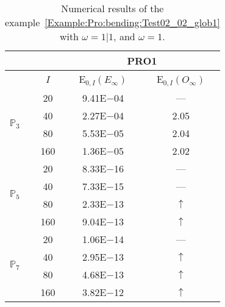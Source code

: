 \begin{table}[H]
\caption{Numerical results of the example~\ref{Example:Pro:bending:Test02_02_glob1} with $\omega=1|1$, and $\omega=1$.}
\setlength{\tabcolsep}{5pt}
\centering
\begin{tabular}{@{}l c c c@{}}
\toprule
 &  & \multicolumn{2}{c}{PRO1}\\
\midrule
 & $I$ & E$_{0,I}(E_{\infty})$ & E$_{0,I}(O_{\infty})$\\
\midrule
\multirow{4}{*}{$\mathbb{P}_{3}$} & 20 & 9.41E$-$04 & ---\\
 & 40 & 2.27E$-$04 & 2.05\\
 & 80 & 5.53E$-$05 & 2.04\\
 & 160 & 1.36E$-$05 & 2.02\\
\midrule
\multirow{4}{*}{$\mathbb{P}_{5}$} & 20 & 8.33E$-$16 & ---\\
 & 40 & 7.33E$-$15 & ---\\
 & 80 & 2.33E$-$13 & $\uparrow$\\
 & 160 & 9.04E$-$13 & $\uparrow$\\
\midrule
\multirow{4}{*}{$\mathbb{P}_{7}$} & 20 & 1.06E$-$14 & ---\\
 & 40 & 2.95E$-$13 & $\uparrow$\\
 & 80 & 4.68E$-$13 & $\uparrow$\\
 & 160 & 3.82E$-$12 & $\uparrow$\\
\bottomrule
\end{tabular}
\label{Table:PRO:test_02_02_test1}
\end{table}
